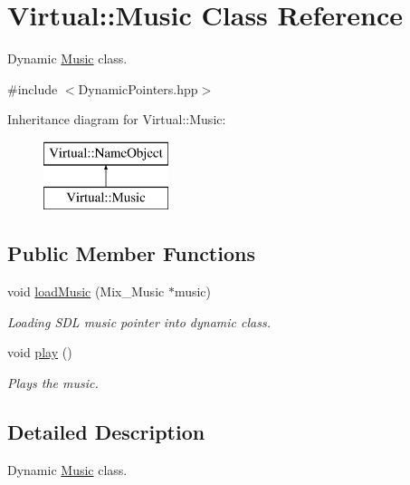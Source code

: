 \hypertarget{class_virtual_1_1_music}{}\section{Virtual\+:\+:Music Class Reference}
\label{class_virtual_1_1_music}


Dynamic \hyperlink{class_virtual_1_1_music}{Music} class.  




{\ttfamily \#include $<$Dynamic\+Pointers.\+hpp$>$}

Inheritance diagram for Virtual\+:\+:Music\+:\begin{figure}[H]
\begin{center}
\leavevmode
\includegraphics[height=2.000000cm]{class_virtual_1_1_music}
\end{center}
\end{figure}
\subsection*{Public Member Functions}
\begin{DoxyCompactItemize}
\item 
void \hyperlink{class_virtual_1_1_music_a0fc4f3eab54d97628eb130a00794ecd8}{load\+Music} (Mix\+\_\+\+Music $\ast$music)
\begin{DoxyCompactList}\small\item\em Loading S\+DL music pointer into dynamic class. \end{DoxyCompactList}\item 
\hypertarget{class_virtual_1_1_music_a24b6650bc34f9a2ad0f38d8ecf0092d5}{}\label{class_virtual_1_1_music_a24b6650bc34f9a2ad0f38d8ecf0092d5} 
void \hyperlink{class_virtual_1_1_music_a24b6650bc34f9a2ad0f38d8ecf0092d5}{play} ()
\begin{DoxyCompactList}\small\item\em Plays the music. \end{DoxyCompactList}\end{DoxyCompactItemize}


\subsection{Detailed Description}
Dynamic \hyperlink{class_virtual_1_1_music}{Music} class. 

